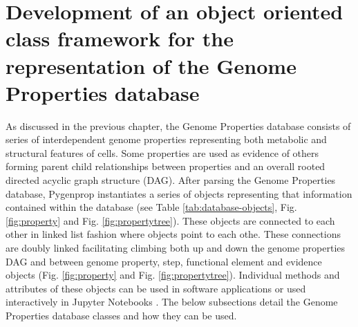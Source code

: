 \section{Development of an object oriented class framework for the representation of the Genome Properties database}

As discussed in the previous chapter, the Genome Properties database consists of series of interdependent genome properties representing both metabolic and structural features of cells. Some properties are used as evidence of others forming parent child relationships between properties and an overall rooted directed acyclic graph structure (DAG). After parsing the Genome Properties database, Pygenprop instantiates a series of objects representing that information contained within the database (see Table \ref{tab:database-objects}, Fig. \ref{fig:property} and Fig. \ref{fig:propertytree}). These objects are connected to each other in linked list fashion where objects point to each othe. These connections are doubly linked facilitating climbing both up and down the genome properties DAG and between genome property, step, functional element and evidence objects (Fig. \ref{fig:property} and Fig. \ref{fig:propertytree}). Individual methods and attributes of these objects can be used in software applications or used interactively in Jupyter Notebooks \cite{kluyver2016jupyter}. The below subsections detail the Genome Properties database classes and how they can be used. 

